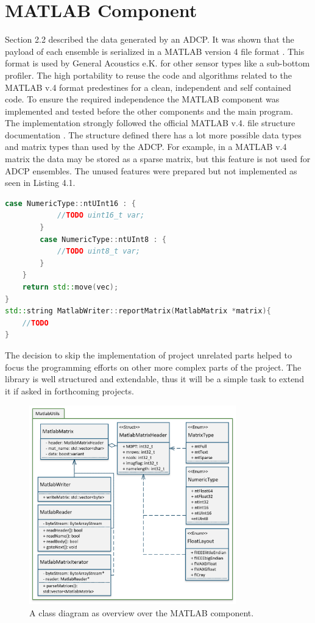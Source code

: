 \section{MATLAB Component}
Section 2.2 described the data generated by an ADCP. It was shown that the payload of each ensemble is serialized in a MATLAB version 4 file format \cite{matlab}. This format is used by General Acoustics e.K. for other sensor types like a sub-bottom profiler. The high portability to reuse the code and algorithms related to the MATLAB v.4 format predestines for a clean, independent and self contained code. To ensure the required independence the MATLAB component was implemented and tested before the other components and the main program.\\
The implementation strongly followed the official MATLAB v.4. file structure documentation \cite{matlab}. The structure defined there has a lot more possible data types and matrix types than used by the ADCP. For example, in a MATLAB v.4 matrix the data may be stored as a sparse matrix, but this feature is not used for ADCP ensembles. The unused features were prepared but not implemented as seen in Listing 4.1.

\begin{lstlisting}[language=C++, caption=Code snippet of not implemented logic]
        case NumericType::ntUInt16 : {
            //TODO uint16_t var;
        }
        case NumericType::ntUInt8 : {
            //TODO uint8_t var;
        }
    }
    return std::move(vec);
}
std::string MatlabWriter::reportMatrix(MatlabMatrix *matrix){
    //TODO
}
\end{lstlisting}

The decision to skip the implementation of project unrelated parts helped to focus the programming efforts on other more complex parts of the project. The library is well structured and extendable, thus it will be a simple task to extend it if asked in forthcoming projects.

\begin{figure}[h]
\centering
      \includegraphics[width=0.8\textwidth]{mlab}
        \caption{A class diagram as overview over the MATLAB component.}
\end{figure}

